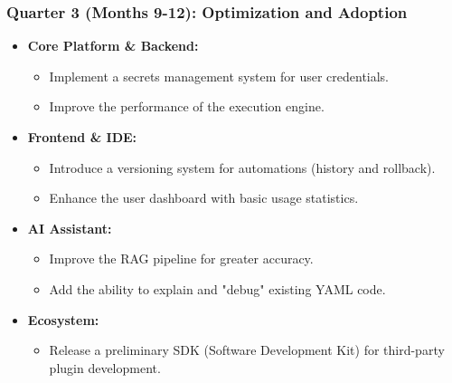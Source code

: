 \documentclass[11pt, a4paper, oneside]{article}
\begin{document}
\subsubsection*{Quarter 3 (Months 9-12): Optimization and Adoption}
\begin{itemize}[leftmargin=*]
    \item \textbf{Core Platform \& Backend:}
    \begin{itemize}
        \item Implement a secrets management system for user credentials.
        \item Improve the performance of the execution engine.
    \end{itemize}
    \item \textbf{Frontend \& IDE:}
    \begin{itemize}
        \item Introduce a versioning system for automations (history and rollback).
        \item Enhance the user dashboard with basic usage statistics.
    \end{itemize}
    \item \textbf{AI Assistant:}
    \begin{itemize}
        \item Improve the RAG pipeline for greater accuracy.
        \item Add the ability to explain and "debug" existing YAML code.
    \end{itemize}
    \item \textbf{Ecosystem:}
    \begin{itemize}
        \item Release a preliminary SDK (Software Development Kit) for third-party plugin development.
    \end{itemize}
\end{itemize}
\end{document}
